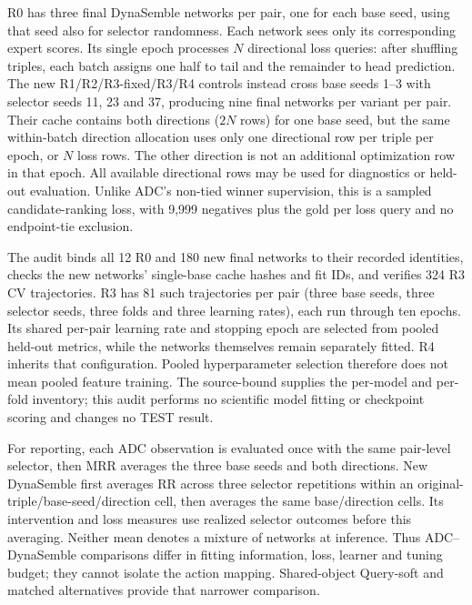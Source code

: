 \documentclass[11pt,a4paper]{article}
\begin{document}
R0 has three final DynaSemble networks per pair, one for each base seed, using that seed also for selector randomness. Each network sees only its corresponding expert scores. Its single epoch processes $N$ directional loss queries: after shuffling triples, each batch assigns one half to tail and the remainder to head prediction. The new R1/R2/R3-fixed/R3/R4 controls instead cross base seeds 1--3 with selector seeds 11, 23 and 37, producing nine final networks per variant per pair. Their cache contains both directions ($2N$ rows) for one base seed, but the same within-batch direction allocation uses only one directional row per triple per epoch, or $N$ loss rows. The other direction is not an additional optimization row in that epoch. All available directional rows may be used for diagnostics or held-out evaluation. Unlike ADC's non-tied winner supervision, this is a sampled candidate-ranking loss, with 9,999 negatives plus the gold per loss query and no endpoint-tie exclusion.

The audit binds all 12 R0 and 180 new final networks to their recorded identities, checks the new networks' single-base cache hashes and fit IDs, and verifies 324 R3 CV trajectories. R3 has 81 such trajectories per pair (three base seeds, three selector seeds, three folds and three learning rates), each run through ten epochs. Its shared per-pair learning rate and stopping epoch are selected from pooled held-out metrics, while the networks themselves remain separately fitted. R4 inherits that configuration. Pooled hyperparameter selection therefore does not mean pooled feature training. The source-bound  supplies the per-model and per-fold inventory; this audit performs no scientific model fitting or checkpoint scoring and changes no TEST result.

For reporting, each ADC observation is evaluated once with the same pair-level selector, then MRR averages the three base seeds and both directions. New DynaSemble first averages RR across three selector repetitions within an original-triple/base-seed/direction cell, then averages the same base/direction cells. Its intervention and loss measures use realized selector outcomes before this averaging. Neither mean denotes a mixture of networks at inference. Thus ADC--DynaSemble comparisons differ in fitting information, loss, learner and tuning budget; they cannot isolate the action mapping. Shared-object Query-soft and matched alternatives provide that narrower comparison.
\end{document}
